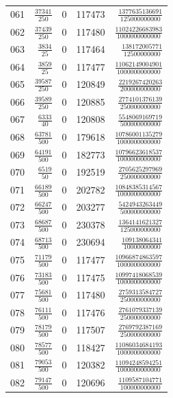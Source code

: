 \begin{longtable}{@{}rrrrr@{}}
061 & $\frac{37341}{250}$ & 0 & 117473 & $\frac{1377635136691}{125000000000}$\\[3pt]
062 & $\frac{37439}{250}$ & 0 & 117480 & $\frac{11024226683983}{1000000000000}$\\[3pt]
063 & $\frac{3834}{25}$ & 0 & 117464 & $\frac{138172005771}{12500000000}$\\[3pt]
064 & $\frac{3859}{25}$ & 0 & 117477 & $\frac{11062149004901}{1000000000000}$\\[3pt]
065 & $\frac{39587}{250}$ & 0 & 120849 & $\frac{2219267420263}{200000000000}$\\[3pt]
066 & $\frac{39589}{250}$ & 0 & 120885 & $\frac{2774101376139}{250000000000}$\\[3pt]
067 & $\frac{6333}{40}$ & 0 & 120808 & $\frac{5548069169719}{500000000000}$\\[3pt]
068 & $\frac{63781}{500}$ & 0 & 179618 & $\frac{10786001135279}{1000000000000}$\\[3pt]
069 & $\frac{64191}{500}$ & 0 & 182773 & $\frac{10796623618537}{1000000000000}$\\[3pt]
070 & $\frac{6519}{50}$ & 0 & 192519 & $\frac{2705625297969}{250000000000}$\\[3pt]
071 & $\frac{66189}{500}$ & 0 & 202782 & $\frac{10848385314567}{1000000000000}$\\[3pt]
072 & $\frac{66247}{500}$ & 0 & 203277 & $\frac{5424943263449}{500000000000}$\\[3pt]
073 & $\frac{68687}{500}$ & 0 & 230378 & $\frac{1364141621327}{125000000000}$\\[3pt]
074 & $\frac{68713}{500}$ & 0 & 230694 & $\frac{109138064341}{10000000000}$\\[3pt]
075 & $\frac{71179}{500}$ & 0 & 117477 & $\frac{10966874863597}{1000000000000}$\\[3pt]
076 & $\frac{73183}{500}$ & 0 & 117475 & $\frac{10997418068539}{1000000000000}$\\[3pt]
077 & $\frac{75681}{500}$ & 0 & 117480 & $\frac{2759313584727}{250000000000}$\\[3pt]
078 & $\frac{76111}{500}$ & 0 & 117476 & $\frac{2761079337139}{250000000000}$\\[3pt]
079 & $\frac{78179}{500}$ & 0 & 117507 & $\frac{2769792387169}{250000000000}$\\[3pt]
080 & $\frac{78577}{500}$ & 0 & 118427 & $\frac{11086034684193}{1000000000000}$\\[3pt]
081 & $\frac{79053}{500}$ & 0 & 120382 & $\frac{11094248594251}{1000000000000}$\\[3pt]
082 & $\frac{79147}{500}$ & 0 & 120696 & $\frac{1109587104771}{100000000000}$\\[3pt]
\bottomrule\end{longtable}
